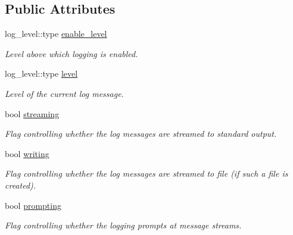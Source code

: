 \subsection*{Public Attributes}
\begin{DoxyCompactItemize}
\item 
\hypertarget{a00326_a3171337db250824f825a71777b18a5a6}{log\-\_\-level\-::type \hyperlink{a00326_a3171337db250824f825a71777b18a5a6}{enable\-\_\-level}}\label{a00326_a3171337db250824f825a71777b18a5a6}

\begin{DoxyCompactList}\small\item\em Level above which logging is enabled. \end{DoxyCompactList}\item 
\hypertarget{a00326_ab5fa0b81374949814298ef5e505410e7}{log\-\_\-level\-::type \hyperlink{a00326_ab5fa0b81374949814298ef5e505410e7}{level}}\label{a00326_ab5fa0b81374949814298ef5e505410e7}

\begin{DoxyCompactList}\small\item\em Level of the current log message. \end{DoxyCompactList}\item 
bool \hyperlink{a00326_a27e6b54cae2e0c36403e0002bbcd1b2c}{streaming}
\begin{DoxyCompactList}\small\item\em Flag controlling whether the log messages are streamed to standard output. \end{DoxyCompactList}\item 
bool \hyperlink{a00326_a6731cdd504121f6565943c9875ab6814}{writing}
\begin{DoxyCompactList}\small\item\em Flag controlling whether the log messages are streamed to file (if such a file is created). \end{DoxyCompactList}\item 
\hypertarget{a00326_a7179753a14e4ef7929aa6c6f2c8da310}{bool \hyperlink{a00326_a7179753a14e4ef7929aa6c6f2c8da310}{prompting}}\label{a00326_a7179753a14e4ef7929aa6c6f2c8da310}

\begin{DoxyCompactList}\small\item\em Flag controlling whether the logging prompts at message streams. \end{DoxyCompactList}\end{DoxyCompactItemize}


